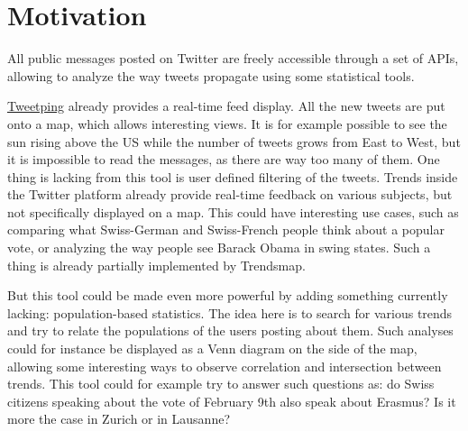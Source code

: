 \section{Motivation}
All public messages posted on Twitter are freely accessible through a set of APIs, allowing to analyze the way tweets propagate using some statistical tools.

\href{http://www.tweetping.net}{Tweetping} already provides a real-time feed display. All the new tweets are put onto a map, which allows interesting views. It is for example possible to see the sun rising above the US while the number of tweets grows from East to West, but it is impossible to read the messages, as there are way too many of them. One thing is lacking from this tool is user defined filtering of the tweets. Trends inside the Twitter platform already provide real-time feedback on various subjects, but not specifically displayed on a map. This could have interesting use cases, such as comparing what Swiss-German and Swiss-French people think about a popular vote, or analyzing the way people see Barack Obama in swing states. Such a thing is already partially implemented by Trendsmap.

But this tool could be made even more powerful by adding something currently lacking: population-based statistics. The idea here is to search for various trends and try to relate the populations of the users posting about them. Such analyses could for instance be displayed as a Venn diagram on the side of the map, allowing some interesting ways to observe correlation and intersection between trends. This tool could for example try to answer such questions as: do Swiss citizens speaking about the vote of February 9th also speak about Erasmus? Is it more the case in Zurich or in Lausanne?
